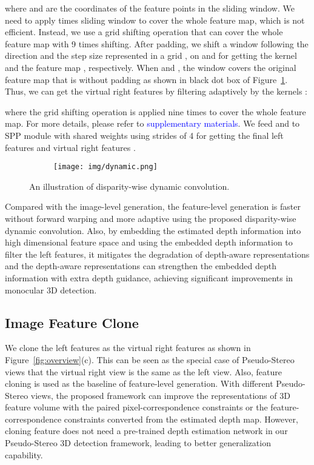 \documentclass[10pt,twocolumn,letterpaper]{article}
\begin{document}
where  and  are the coordinates of the feature points in the sliding window. We need to apply  times sliding window to cover the whole feature map, which is not efficient. Instead, we use a grid shifting operation that can cover the whole feature map with 9 times shifting. After padding, we shift a  window following the direction and the step size represented in a  grid ,  on  and  for getting the kernel  and the feature map  , respectively. When  and , the  window covers the original feature map that is without padding as shown in black dot box of Figure~\ref{fig:conv}. Thus, we can get the virtual right features  by filtering  adaptively by the kernels :

where the grid shifting operation is applied nine times to cover the whole feature map. For more details, please refer to \textcolor{blue}{supplementary materials}. We feed  and  to SPP module with shared weights using strides of 4 for getting the final left features  and virtual right features .

\begin{figure}[t!]
    \centering
    \begin{subfigure}{\columnwidth}
        \texttt{[image: img/dynamic.png]}
    \end{subfigure}
    \vspace{-3mm}
    \caption{\small An illustration of disparity-wise dynamic convolution.}
    \label{fig:conv}
    \vspace{-3mm}
\end{figure}
Compared with the image-level generation, the feature-level generation is faster without forward warping and more adaptive using the proposed disparity-wise dynamic convolution.
Also, by embedding the estimated depth information into high dimensional feature space and using the embedded depth information to filter the left features, it mitigates the degradation of depth-aware representations and the depth-aware representations can strengthen the embedded depth information with extra depth guidance, achieving significant improvements in monocular 3D detection. 

\subsection{Image Feature Clone}\label{sec:img}
\vspace{-1mm}
We clone the left features as the virtual right features as shown in Figure~\ref{fig:overview}(c). This can be seen as the special case of Pseudo-Stereo views that the virtual right view is the same as the left view. Also, feature cloning is used as the baseline of feature-level generation. With different Pseudo-Stereo views, the proposed framework can improve the representations of 3D feature volume with the paired pixel-correspondence constraints or the feature-correspondence constraints converted from the estimated depth map. However, cloning feature does not need a pre-trained depth estimation network in our Pseudo-Stereo 3D detection framework, leading to better generalization capability.   
\end{document}
